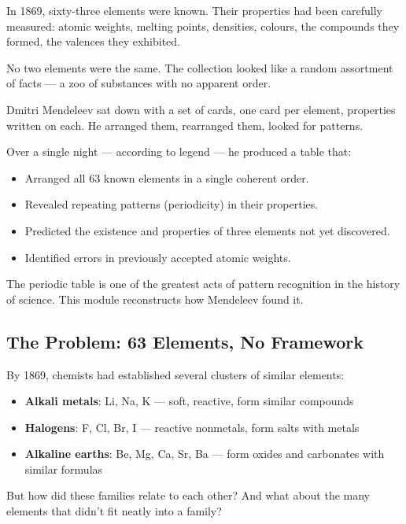 \documentclass[12pt, a4paper]{book}
\begin{document}
In 1869, sixty-three elements were known.
Their properties had been carefully measured:
atomic weights, melting points, densities, colours,
the compounds they formed, the valences they exhibited.

No two elements were the same.
The collection looked like a random assortment of facts ---
a zoo of substances with no apparent order.

Dmitri Mendeleev sat down with a set of cards,
one card per element, properties written on each.
He arranged them, rearranged them, looked for patterns.

Over a single night --- according to legend ---
he produced a table that:
\begin{itemize}[nosep, leftmargin=2em]
  \item Arranged all 63 known elements in a single coherent order.
  \item Revealed repeating patterns (periodicity) in their properties.
  \item Predicted the existence and properties of three
        elements not yet discovered.
  \item Identified errors in previously accepted atomic weights.
\end{itemize}

The periodic table is one of the greatest acts of pattern
recognition in the history of science.
This module reconstructs how Mendeleev found it.

\subsection{The Problem: 63 Elements, No Framework}

By 1869, chemists had established several clusters of
similar elements:
\begin{itemize}[nosep, leftmargin=2em]
  \item \textbf{Alkali metals}: Li, Na, K --- soft, reactive,
        form similar compounds
  \item \textbf{Halogens}: F, Cl, Br, I --- reactive nonmetals,
        form salts with metals
  \item \textbf{Alkaline earths}: Be, Mg, Ca, Sr, Ba ---
        form oxides and carbonates with similar formulas
\end{itemize}

But how did these families relate to each other?
And what about the many elements that didn't fit neatly
into a family?
\end{document}
